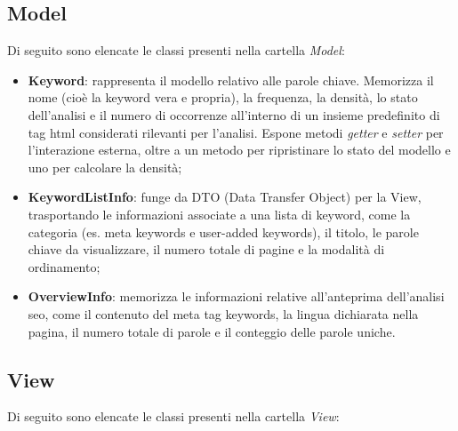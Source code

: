 \subsection{Model}

Di seguito sono elencate le classi presenti nella cartella \textit{Model}:

\begin{itemize}
  \item \textbf{Keyword}: rappresenta il modello relativo alle parole chiave. Memorizza il nome (cioè la keyword vera e propria), la frequenza, la densità, lo stato dell’analisi e il numero di occorrenze all’interno di un insieme predefinito di tag \gls{html} considerati rilevanti per l’analisi. Espone metodi \textit{getter} e \textit{setter} per l’interazione esterna, oltre a un metodo per ripristinare lo stato del modello e uno per calcolare la densità;
  \item \textbf{KeywordListInfo}: funge da DTO (Data Transfer Object) per la View, trasportando le informazioni associate a una lista di keyword, come la categoria (es. meta keywords e user-added keywords), il titolo, le parole chiave da visualizzare, il numero totale di pagine e la modalità di ordinamento;
  \item \textbf{OverviewInfo}: memorizza le informazioni relative all’anteprima dell’analisi \gls{seo}, come il contenuto del meta tag keywords, la lingua dichiarata nella pagina, il numero totale di parole e il conteggio delle parole uniche.
\end{itemize}

\subsection{View}

Di seguito sono elencate le classi presenti nella cartella \textit{View}:

